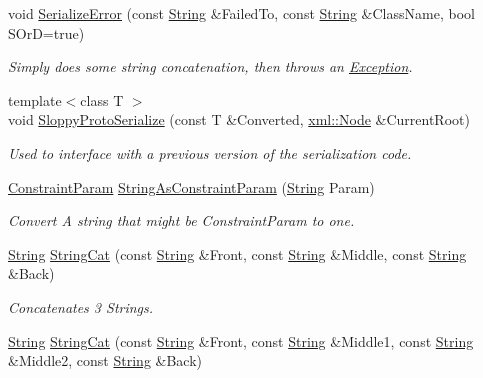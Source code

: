 \begin{DoxyCompactItemize}
void \hyperlink{namespacephys_a3d75403c50afb8ed658bb9f22a70939f}{SerializeError} (const \hyperlink{namespacephys_aa03900411993de7fbfec4789bc1d392e}{String} \&FailedTo, const \hyperlink{namespacephys_aa03900411993de7fbfec4789bc1d392e}{String} \&ClassName, bool SOrD=true)
\begin{DoxyCompactList}\small\item\em Simply does some string concatenation, then throws an \hyperlink{classphys_1_1Exception}{Exception}. \item\end{DoxyCompactList}\item 
{\footnotesize template$<$class T $>$ }\\void \hyperlink{namespacephys_a0486c9d6d2e192963225155a6ba40506}{SloppyProtoSerialize} (const T \&Converted, \hyperlink{classphys_1_1xml_1_1Node}{xml::Node} \&CurrentRoot)
\begin{DoxyCompactList}\small\item\em Used to interface with a previous version of the serialization code. \item\end{DoxyCompactList}\item 
\hyperlink{namespacephys_aa1e7cf2d7efcaeaeac304f711e7564e8}{ConstraintParam} \hyperlink{namespacephys_ac50a6d941d823b8832a4098b078ab11c}{StringAsConstraintParam} (\hyperlink{namespacephys_aa03900411993de7fbfec4789bc1d392e}{String} Param)
\begin{DoxyCompactList}\small\item\em Convert A string that might be ConstraintParam to one. \item\end{DoxyCompactList}\item 
\hyperlink{namespacephys_aa03900411993de7fbfec4789bc1d392e}{String} \hyperlink{namespacephys_a63b5574e497344727dfb4e244511f2fb}{StringCat} (const \hyperlink{namespacephys_aa03900411993de7fbfec4789bc1d392e}{String} \&Front, const \hyperlink{namespacephys_aa03900411993de7fbfec4789bc1d392e}{String} \&Middle, const \hyperlink{namespacephys_aa03900411993de7fbfec4789bc1d392e}{String} \&Back)
\begin{DoxyCompactList}\small\item\em Concatenates 3 Strings. \item\end{DoxyCompactList}\item 
\hyperlink{namespacephys_aa03900411993de7fbfec4789bc1d392e}{String} \hyperlink{namespacephys_aa023584b6c0b8daa4b6abb9108d6e917}{StringCat} (const \hyperlink{namespacephys_aa03900411993de7fbfec4789bc1d392e}{String} \&Front, const \hyperlink{namespacephys_aa03900411993de7fbfec4789bc1d392e}{String} \&Middle1, const \hyperlink{namespacephys_aa03900411993de7fbfec4789bc1d392e}{String} \&Middle2, const \hyperlink{namespacephys_aa03900411993de7fbfec4789bc1d392e}{String} \&Back)

\end{DoxyCompactItemize}
